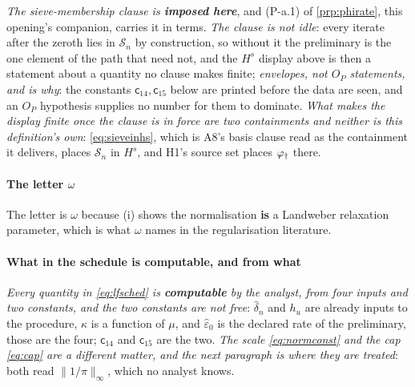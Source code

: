 \emph{The sieve-membership clause is \textbf{imposed here}}, and (P-a.1) of \cref{prp:phirate}, this
opening's companion, carries it in terms. \emph{The clause is not idle}: every iterate after the zeroth
lies in $\mathcal S_n$
by construction, so without it the preliminary is the one element of the path that need not, and the
$H^{s}$ display above is then a statement about a quantity no clause makes finite; \emph{envelopes, not $O_P$
statements, and  is why}: the constants $\mathsf c_{14},\mathsf c_{15}$ below are
printed before the data are seen, and an $O_P$ hypothesis supplies no number for them to dominate.
\emph{What makes the display finite once the clause is in force are two containments and neither is
this definition's own}: \eqref{eq:sieveinhs}, which is A8's basis clause read as the containment it
delivers, places $\mathcal S_n$ in $H^{s}$, and H1's source set places $\varphi_{\dagger}$ there.

\paragraph{The letter $\omega$}

The letter is $\omega$ because (i) shows the normalisation \textbf{is} a
Landweber relaxation parameter, which is what $\omega$ names in the regularisation literature.

\paragraph{What in the schedule is computable, and from what}

\emph{Every quantity in \eqref{eq:lfsched} is \textbf{computable} by the analyst, from four inputs and
two constants, and the two constants are not free}: $\hat\delta_n$ and $h_u$ are already inputs to the
procedure, $\kappa$ is a function of $\mu$, and $\hat\varepsilon_0$ is the declared rate of the
preliminary, those are the four; $\mathsf c_{14}$ and $\mathsf c_{15}$ are the two.
\emph{The scale \eqref{eq:normconst} and the cap \eqref{eq:cap} are a different matter, and the next
paragraph is where they are treated}: both read $\|1/\pi\|_\infty$, which no analyst knows.

